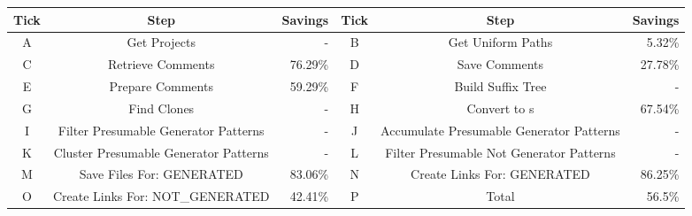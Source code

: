 \setlength{\extrarowheight}{.0em}
\begin{table}
	\label{table:tickLabels}
		\begin{tabularx}{\textwidth}{c|C|r|||c|C|r}
			\textbf{Tick} & \textbf{Step} & \textbf{Savings} & \textbf{Tick} & \textbf{Step} & \textbf{Savings}\\
			\hline
			A & Get Projects & - & B & Get Uniform Paths & 5.32\% \\
			C & Retrieve Comments & 76.29\% & D & Save Comments & 27.78\% \\
			E & Prepare Comments & 59.29\% &F& Build Suffix Tree & - \\
			G& Find Clones & - & H & Convert to s & 67.54\%\\
			I&Filter Presumable Generator Patterns & - &J&Accumulate Presumable Generator Patterns & -\\
			K&Cluster Presumable Generator Patterns & - &L&Filter Presumable Not Generator Patterns & -\\
			M& Save Files For: GENERATED& 83.06\% &N&Create Links For: GENERATED & 86.25\%\\
			O& Create Links For: NOT\_GENERATED& 42.41\% & P & Total & 56.5\%
		\end{tabularx}
\end{table}
\setlength{\extrarowheight}{0em}
